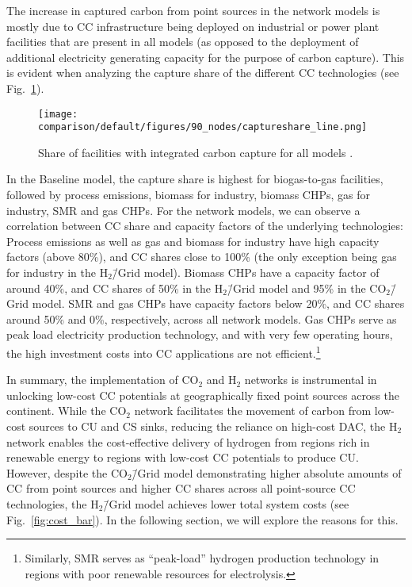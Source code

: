 \documentclass[twocolumn]{article}
\newcommand{\COtwo}{CO$_2$}
\newcommand{\Htwo}{H$_2$}
\newcommand{\modBase}{Baseline model}
\newcommand{\modCO}{CO$_2$\=/Grid model}
\newcommand{\modH}{H$_2$\=/Grid model}
\begin{document}
The increase in captured carbon from point sources in the network models is mostly due to CC infrastructure being deployed on industrial or power plant facilities that are present in all models (as opposed to the deployment of additional electricity generating capacity for the purpose of carbon capture). This is evident when analyzing the capture share of the different CC technologies (see Fig.~\ref{fig:captureshare_line}).


\begin{figure}[h]
    \centering
    \texttt{[image: comparison/default/figures/90\_nodes/captureshare\_line.png]}
    \caption{Share of facilities with integrated carbon capture for all models .}
    \label{fig:captureshare_line}
\end{figure}%

In the \modBase{}, the capture share is highest for biogas-to-gas facilities, followed by process emissions, biomass for industry, biomass CHPs, gas for industry, SMR and gas CHPs. For the network models, we can observe a correlation between CC share and capacity factors of the underlying technologies: Process emissions as well as gas and biomass for industry have high capacity factors (above 80\%), and CC shares close to 100\% (the only exception being gas for industry in the \modH{}). Biomass CHPs have a capacity factor of around 40\%, and CC shares of 50\% in the \modH{} and 95\% in the \modCO{}. SMR and gas CHPs have capacity factors below 20\%, and CC shares around 50\% and 0\%, respectively, across all network models. Gas CHPs serve as peak load electricity production technology, and with very few operating hours, the high investment costs into CC applications are not efficient.\footnote[1]{Similarly, SMR serves as ``peak-load'' hydrogen production technology in regions with poor renewable resources for electrolysis.}


In summary, the implementation of \COtwo{} and \Htwo{} networks is instrumental in unlocking low-cost CC potentials at geographically fixed point sources across the continent. While the \COtwo{} network facilitates the movement of carbon from low-cost sources to CU and CS sinks, reducing the reliance on high-cost DAC, the \Htwo{} network enables the cost-effective delivery of hydrogen from regions rich in renewable energy to regions with low-cost CC potentials to produce CU. However, despite the \modCO{} demonstrating higher absolute amounts of CC from point sources and higher CC shares across all point-source CC technologies, the \modH{} achieves lower total system costs (see Fig.~\ref{fig:cost_bar}). In the following section, we will explore the reasons for this.
\end{document}
